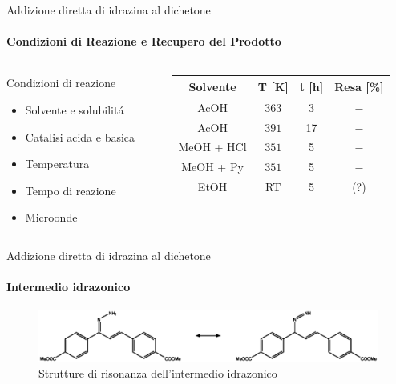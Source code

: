 \documentclass[aspectration=169]{beamer}
\begin{document}
\begin{frame}{Addizione diretta di idrazina al dichetone}
	\framesubtitle{Condizioni di Reazione e Recupero del Prodotto}
	\begin{columns}
		\hspace{1cm}
		\begin{column}{0.5\textwidth}
			Condizioni di reazione
			\begin{itemize}
				\item Solvente e solubilitá
				\item Catalisi acida e basica
				\item Temperatura
				\item Tempo di reazione
				\item Microonde
			\end{itemize}
		\end{column}
		\hspace{-3cm}
		\begin{column}{0.5\textwidth}
			\begin{footnotesize}
				\begin{center}
					\begin{tabular}{cccc}
						\toprule
						{Solvente} & T [K]   & t [h] & Resa [\%] \\
						\midrule
						AcOH       & \(363\) & 3     & \(-\)     \\
						AcOH       & \(391\) & 17    & \(-\)     \\
						MeOH + HCl & \(351\) & 5     & \(-\)     \\
						MeOH + Py  & \(351\) & 5     & \(-\)     \\
						EtOH       & RT      & 5     & (?)       \\
						\bottomrule
					\end{tabular}
				\end{center}
			\end{footnotesize}
		\end{column}
	\end{columns}
\end{frame}

\begin{frame}{Addizione diretta di idrazina al dichetone}
	\framesubtitle{Intermedio idrazonico}
	\begin{figure}[h!]
		\centering
		\includegraphics[width=13cm,keepaspectratio]{../Structures/idrazone.eps}
		\caption{Strutture di risonanza dell'intermedio idrazonico}
	\end{figure}
\end{frame}
\end{document}
